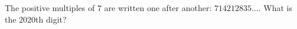 The positive multiples of $7$ are written one after another: $714212835\ldots$. What is the $2020$th digit?
